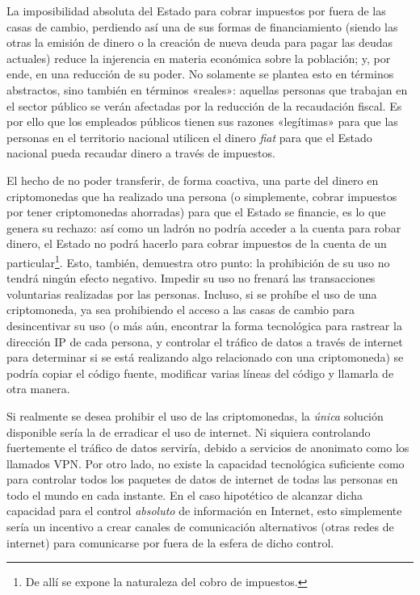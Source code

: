 \documentclass[12pt,a4paper,twoside]{book}
\begin{document}
La imposibilidad absoluta del Estado para cobrar impuestos por fuera de las casas de cambio, perdiendo así una de sus formas de financiamiento (siendo las otras la emisión de dinero o la creación de nueva deuda para pagar las deudas actuales) reduce la injerencia en materia económica sobre la población; y, por ende, en una reducción de su poder. No solamente se plantea esto en términos abstractos, sino también en términos «reales»: aquellas personas que trabajan en el sector público se verán afectadas por la reducción de la recaudación fiscal. Es por ello que los empleados públicos tienen sus razones «legítimas» para que las personas en el territorio nacional utilicen el dinero \textit{fiat} para que el Estado nacional pueda recaudar dinero a través de impuestos.

El hecho de no poder transferir, de forma coactiva, una parte del dinero en criptomonedas que ha realizado una persona (o simplemente, cobrar impuestos por tener criptomonedas ahorradas) para que el Estado se financie, es lo que genera su rechazo: así como un ladrón no podría acceder a la cuenta para robar dinero, el Estado no podrá hacerlo para cobrar impuestos de la cuenta de un particular\footnote{De allí se expone la naturaleza del cobro de impuestos.}. Esto, también, demuestra otro punto: la prohibición de su uso no tendrá ningún efecto negativo. Impedir su uso no frenará las transacciones voluntarias realizadas por las personas. Incluso, si se prohíbe el uso de una criptomoneda, ya sea prohibiendo el acceso a las casas de cambio para desincentivar su uso (o más aún, encontrar la forma tecnológica para rastrear la dirección IP de cada persona, y controlar el tráfico de datos a través de internet para determinar si se está realizando algo relacionado con una criptomoneda) se podría copiar el código fuente, modificar varias líneas del código y llamarla de otra manera.

Si realmente se desea prohibir el uso de las criptomonedas, la \textit{única} solución disponible sería la de erradicar el uso de internet. Ni siquiera controlando fuertemente el tráfico de datos serviría, debido a servicios de anonimato como los llamados VPN. Por otro lado, no existe la capacidad tecnológica suficiente como para controlar todos los paquetes de datos de internet de todas las personas en todo el mundo en cada instante. En el caso hipotético de alcanzar dicha capacidad para el control \textit{absoluto} de información en Internet, esto simplemente sería un incentivo a crear canales de comunicación alternativos (otras redes de internet) para comunicarse por fuera de la esfera de dicho control.
\end{document}
